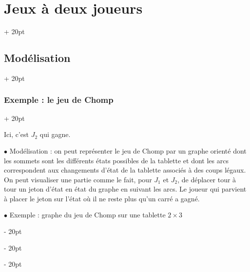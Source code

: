 \documentclass[a4paper, 12pt, twoside]{article}
\newcommand{\ind}[1][20pt]{\advance\leftskip + #1}
\newcommand{\deind}[1][20pt]{\advance\leftskip - #1}
\newenvironment{indt}[2][20pt]{#2 \par \ind[#1]}{\par \deind} %
\begin{document}
\begin{indt}{\section{Jeux à deux joueurs}}
\begin{indt}{\subsection{Modélisation}}
\begin{indt}{\subsubsection{Exemple : le jeu de Chomp}}
\begin{center}
                \end{center}

                Ici, c'est $J_2$ qui gagne.

                \vspace{12pt}
                
                $\bullet$ Modélisation : on peut représenter le jeu de Chomp par un graphe orienté dont les sommets sont les différents états possibles de la tablette et dont les arcs correspondent aux changements d'état de la tablette associés à des coups légaux. On peut visualiser une partie comme le fait, pour $J_1$ et $J_2$, de déplacer tour à tour un jeton d'état en état du graphe en suivant les arcs.
                Le joueur qui parvient à placer le jeton sur l'état où il ne reste plus qu'un carré a gagné.

                \vspace{12pt}
                
                $\bullet$ Exemple : graphe du jeu de Chomp sur une tablette $2 \times 3$


\end{indt}
\end{indt}
\end{indt}
\end{document}
